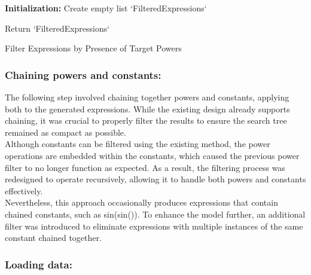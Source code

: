 \documentclass{article}
\begin{document}
\begin{algorithm}[H]
\SetAlgoLined
{}

\textbf{Initialization:}\;
Create empty list `FilteredExpressions`\;


Return `FilteredExpressions`\;

\caption{Filter Expressions by Presence of Target Powers}
\label{alg:filter_powers} %
\end{algorithm}



\subsubsection{Chaining powers and constants:}

The following step involved chaining together powers and constants, applying both to the generated expressions. While the existing design already supports chaining, it was crucial to properly filter the results to ensure the search tree remained as compact as possible.\\

Although constants can be filtered using the existing method, the power operations are embedded within the constants, which caused the previous power filter to no longer function as expected. As a result, the filtering process was redesigned to operate recursively, allowing it to handle both powers and constants effectively.\\

Nevertheless, this approach occasionally produces expressions that contain chained constants, such as sin(sin()). To enhance the model further, an additional filter was introduced to eliminate expressions with multiple instances of the same constant chained together.\\


\subsubsection{Loading data:}
\end{document}

